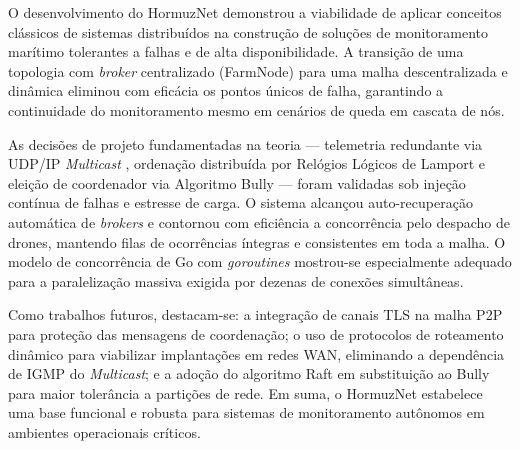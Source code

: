 O desenvolvimento do HormuzNet demonstrou a viabilidade de aplicar conceitos clássicos de sistemas distribuídos na construção de soluções de monitoramento marítimo tolerantes a falhas e de alta disponibilidade. A transição de uma topologia com \textit{broker} centralizado (FarmNode) para uma malha descentralizada e dinâmica eliminou com eficácia os pontos únicos de falha, garantindo a continuidade do monitoramento mesmo em cenários de queda em cascata de nós.

As decisões de projeto fundamentadas na teoria --- telemetria redundante via UDP/IP \textit{Multicast} \cite{rfc768}, ordenação distribuída por Relógios Lógicos de Lamport \cite{lamport1978time} e eleição de coordenador via Algoritmo Bully \cite{tanenbaum2021redes} --- foram validadas sob injeção contínua de falhas e estresse de carga. O sistema alcançou auto-recuperação automática de \textit{brokers} e contornou com eficiência a concorrência pelo despacho de drones, mantendo filas de ocorrências íntegras e consistentes em toda a malha. O modelo de concorrência de Go com \textit{goroutines} mostrou-se especialmente adequado para a paralelização massiva exigida por dezenas de conexões simultâneas.

Como trabalhos futuros, destacam-se: a integração de canais TLS na malha P2P para proteção das mensagens de coordenação; o uso de protocolos de roteamento dinâmico para viabilizar implantações em redes WAN, eliminando a dependência de IGMP do \textit{Multicast}; e a adoção do algoritmo Raft em substituição ao Bully para maior tolerância a partições de rede. Em suma, o HormuzNet estabelece uma base funcional e robusta para sistemas de monitoramento autônomos em ambientes operacionais críticos.
